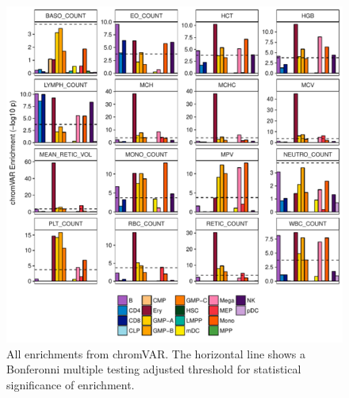 \documentclass{article}\usepackage[]{graphicx}\usepackage[]{color}
\makeatletter
\def\maxwidth{ %
  \ifdim\Gin@nat@width>\linewidth
    \linewidth
  \else
    \Gin@nat@width
  \fi
}
\newenvironment{knitrout}{}{} %
\makeatother
\begin{document}
\begin{knitrout}
\color{fgcolor}\begin{figure}[H]

{\centering \includegraphics[width=\maxwidth]{figure/allchromVAR-1} 

}

\caption[All enrichments from chromVAR]{All enrichments from chromVAR. The horizontal line shows a Bonferonni multiple testing adjusted threshold for statistical significance of enrichment.}\label{fig:allchromVAR}
\end{figure}


\end{knitrout}
\end{document}
